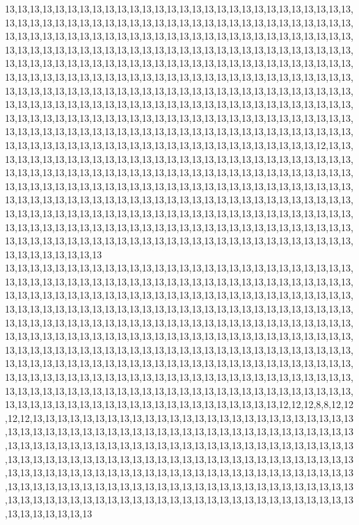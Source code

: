 13,13,13,13,13,13,13,13,13,13,13,13,13,13,13,13,13,13,13,13,13,13,13,13,13,13,13,13,13,13,13,13,13,13,13,13,13,13,13,13,13,13,13,13,13,13,13,13,13,13,13,13,13,13,13,13,13,13,13,13,13,13,13,13,13,13,13,13,13,13,13,13,13,13,13,13,13,13,13,13,13,13,13,13,13,13,13,13,13,13,13,13,13,13,13,13,13,13,13,13,13,13,13,13,13,13,13,13,13,13,13,13,13,13,13,13,13,13,13,13,13,13,13,13,13,13,13,13,13,13,13,13,13,13,13,13,13,13,13,13,13,13,13,13,13,13,13,13,13,13,13,13,13,13,13,13,13,13,13,13,13,13,13,13,13,13,13,13,13,13,13,13,13,13,13,13,13,13,13,13,13,13,13,13,13,13,13,13,13,13,13,13,13,13,13,13,13,13,13,13,13,13,13,13,13,13,13,13,13,13,13,13,13,13,13,13,13,13,13,13,13,13,13,13,13,13,13,13,13,13,13,13,13,13,13,13,13,13,13,13,13,13,13,13,13,13,13,13,13,13,13,13,13,13,13,13,13,13,13,13,13,13,13,13,13,13,13,13,13,13,13,13,13,13,13,13,13,13,13,13,13,13,13,13,13,13,13,13,13,13,13,13,13,13,13,13,13,13,13,13,13,13,13,13,13,12,13,13,13,13,13,13,13,13,13,13,13,13,13,13,13,13,13,13,13,13,13,13,13,13,13,13,13,13,13,13,13,13,13,13,13,13,13,13,13,13,13,13,13,13,13,13,13,13,13,13,13,13,13,13,13,13,13,13,13,13,13,13,13,13,13,13,13,13,13,13,13,13,13,13,13,13,13,13,13,13,13,13,13,13,13,13,13,13,13,13,13,13,13,13,13,13,13,13,13,13,13,13,13,13,13,13,13,13,13,13,13,13,13,13,13,13,13,13,13,13,13,13,13,13,13,13,13,13,13,13,13,13,13,13,13,13,13,13,13,13,13,13,13,13,13,13,13,13,13,13,13,13,13,13,13,13,13,13,13,13,13,13,13,13,13,13,13,13,13,13,13,13,13,13,13,13,13,13,13,13,13,13,13,13,13,13,13,13,13,13,13,13,13,13,13,13,13,13,13,13,13,13,13,13,13,13
13,13,13,13,13,13,13,13,13,13,13,13,13,13,13,13,13,13,13,13,13,13,13,13,13,13,13,13,13,13,13,13,13,13,13,13,13,13,13,13,13,13,13,13,13,13,13,13,13,13,13,13,13,13,13,13,13,13,13,13,13,13,13,13,13,13,13,13,13,13,13,13,13,13,13,13,13,13,13,13,13,13,13,13,13,13,13,13,13,13,13,13,13,13,13,13,13,13,13,13,13,13,13,13,13,13,13,13,13,13,13,13,13,13,13,13,13,13,13,13,13,13,13,13,13,13,13,13,13,13,13,13,13,13,13,13,13,13,13,13,13,13,13,13,13,13,13,13,13,13,13,13,13,13,13,13,13,13,13,13,13,13,13,13,13,13,13,13,13,13,13,13,13,13,13,13,13,13,13,13,13,13,13,13,13,13,13,13,13,13,13,13,13,13,13,13,13,13,13,13,13,13,13,13,13,13,13,13,13,13,13,13,13,13,13,13,13,13,13,13,13,13,13,13,13,13,13,13,13,13,13,13,13,13,13,13,13,13,13,13,13,13,13,13,13,13,13,13,13,13,13,13,13,13,13,13,13,13,13,13,13,13,13,13,13,13,13,13,13,13,13,13,13,13,13,13,13,13,13,13,13,13,13,13,13,13,13,13,13,13,13,13,13,13,13,13,13,13,13,13,13,13,12,12,12,8,8,12,12,12,12,13,13,13,13,13,13,13,13,13,13,13,13,13,13,13,13,13,13,13,13,13,13,13,13,13,13,13,13,13,13,13,13,13,13,13,13,13,13,13,13,13,13,13,13,13,13,13,13,13,13,13,13,13,13,13,13,13,13,13,13,13,13,13,13,13,13,13,13,13,13,13,13,13,13,13,13,13,13,13,13,13,13,13,13,13,13,13,13,13,13,13,13,13,13,13,13,13,13,13,13,13,13,13,13,13,13,13,13,13,13,13,13,13,13,13,13,13,13,13,13,13,13,13,13,13,13,13,13,13,13,13,13,13,13,13,13,13,13,13,13,13,13,13,13,13,13,13,13,13,13,13,13,13,13,13,13,13,13,13,13,13,13,13,13,13,13,13,13,13,13,13,13,13,13,13,13,13,13,13,13,13,13,13,13,13,13,13,13,13,13,13,13,13,13,13,13,13,13,13,13,13
